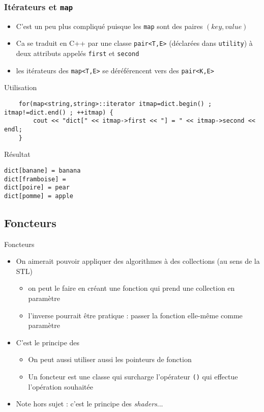 \begin{frame}[fragile]\frametitle{Itérateurs et \texttt{map}}
\begin{itemize}
\item C'est un peu plus compliqué puisque les \verb|map| sont des paires $(key,value)$
\item Ca se traduit en C++ par une classe \verb|pair<T,E>| (déclarées dans \verb|utility|) à deux attributs appelés \verb|first| et \verb|second|
\item les itérateurs des \verb|map<T,E>| se déréférencent vers des \verb|pair<K,E>|
\end{itemize}
\begin{codeblock}{Utilisation}
\begin{lstlisting}
    for(map<string,string>::iterator itmap=dict.begin() ; itmap!=dict.end() ; ++itmap) {
        cout << "dict[" << itmap->first << "] = " << itmap->second << endl;
    }
\end{lstlisting}
\end{codeblock}
\begin{block}{Résultat}
{\tiny
\begin{verbatim}
dict[banane] = banana
dict[framboise] =
dict[poire] = pear
dict[pomme] = apple
\end{verbatim}
}
\end{block}
\end{frame}


\subsection{Foncteurs}

\begin{frame}{Foncteurs}

\begin{itemize}
\itemsep1pt\parskip0pt
\item
  On aimerait pouvoir appliquer des algorithmes à des collections (au
  sens de la STL)

  \begin{itemize}
  \itemsep1pt\parskip0pt
  \item
    on peut le faire en créant une fonction qui prend une collection en
    paramètre
  \item
    l'inverse pourrait être pratique : passer la fonction elle-même
    comme paramètre
  \end{itemize}
\item
  C'est le principe des 

  \begin{itemize}
  \itemsep1pt\parskip0pt
  \item
    On peut aussi utiliser aussi les pointeurs de fonction
  \item
    Un foncteur est une classe qui surcharge l'opérateur \texttt{()} qui effectue
    l'opération souhaitée
  \end{itemize}
  \item Note hors sujet : c'est le principe des \textit{shaders}...
\end{itemize}

\end{frame}

